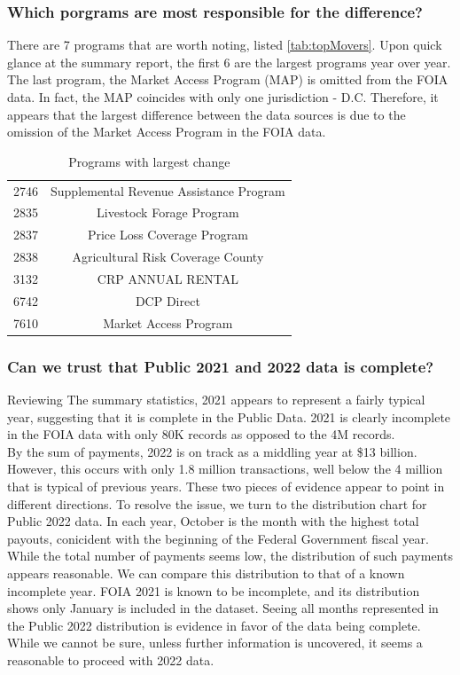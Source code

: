 \documentclass{article}
\begin{document}
\subsubsection*{Which porgrams are most responsible for the difference?}
There are 7 programs that are worth noting, listed \autoref{tab:topMovers}. Upon quick glance at the 
summary report, the first 6 are the largest programs year over year. The last program, the Market Access Program (MAP) 
is omitted from the FOIA data. In fact, the MAP coincides with only one jurisdiction - D.C. Therefore, it appears that 
the largest difference between the data sources is due to the omission of the Market Access Program in the FOIA data. 

\begin{table}[H]
    \caption{Programs with largest change}\label{tab:topMovers}
    \centering
    \begin{tabular}{|c|c|}
        \hline
        2746 & Supplemental Revenue Assistance Program \\ 
        2835 & Livestock Forage Program \\ 
        2837 & Price Loss Coverage Program \\ 
        2838 & Agricultural Risk Coverage \- County \\ 
        3132 & CRP \- ANNUAL RENTAL \\ 
        6742 & DCP \- Direct \\ 
        7610 & Market Access Program \\
        \hline
    \end{tabular}
\end{table}



\subsubsection*{Can we trust that Public 2021 and 2022 data is complete?}
Reviewing The summary statistics, 2021 appears to represent a fairly typical year, suggesting that it is complete in the Public Data. 2021 
is clearly incomplete in the FOIA data with only 80K records as opposed to the 4M records. \\ 
By the sum of payments, 2022 is on track as a middling year at \$13 billion. However, this occurs 
with only 1.8 million transactions, well below the 4 million that is typical of previous years. 
These two pieces of evidence appear to point in different directions. To resolve the issue, we turn to 
the distribution chart for Public 2022 data. In each year, October is the month with the highest total 
payouts, conicident with the beginning of the Federal Government fiscal year. While the total number of 
payments seems low, the distribution of such payments appears reasonable. We can compare this distribution 
to that of a known incomplete year. FOIA 2021 is known to be incomplete, and its distribution shows only January is 
included in the dataset. Seeing all months represented in the Public 2022 distribution is evidence in favor 
of the data being complete. While we cannot be sure, unless further information is uncovered, 
it seems a reasonable to proceed with 2022 data. 
\end{document}
